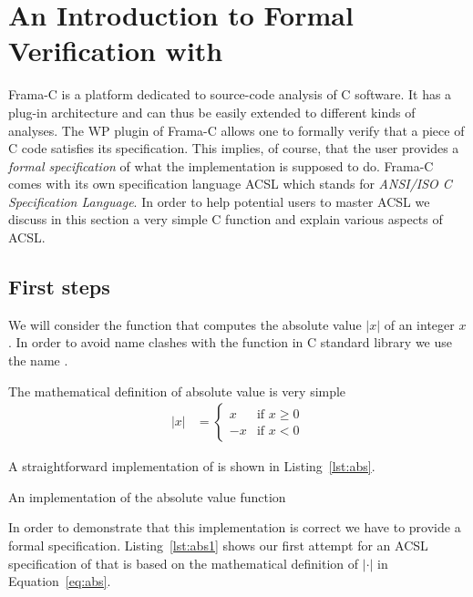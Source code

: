 
\section{An Introduction to Formal Verification with \framacwp}
\label{sec:frama-c}

Frama-C is a platform dedicated to source-code analysis of C software.
It has a plug-in architecture and can thus be easily extended to 
different kinds of analyses.
The WP plugin of Frama-C allows one to formally verify that a piece of
C code satisfies its specification.
This implies, of course, that the user provides a \emph{formal specification}
of what the implementation is supposed to do.
Frama-C comes with its own specification language ACSL which stands for
\emph{ANSI\slash ISO C Specification Language}.
In order to help potential users to master ACSL we discuss in this section 
a very simple C function and explain various aspects of ACSL.

\subsection{First steps}

We will consider the function that computes the absolute value $|x|$
of an integer $x$.
In order to avoid name clashes with the function  in C standard library
we use the name .

The mathematical definition of absolute value is very simple
\begin{align}
\label{eq:abs}
   |x| &= \left\{
            \begin{array}{rl}
               x  & \text{if $x \geq 0$} \\
               -x & \text{if $x < 0$}
            \end{array}
          \right.
\end{align}

A straightforward implementation of  is shown in Listing~\ref{lst:abs}.

\begin{listing}[hbt]
\begin{minipage}{\textwidth}

\end{minipage}
\caption{\label{lst:abs} An implementation of the absolute value function}
\end{listing}

In order to demonstrate that this implementation is correct we have to provide
a formal specification.
Listing~\ref{lst:abs1} shows our first attempt for an ACSL specification of  that
is based on the mathematical definition of $|\cdot|$ in Equation~\ref{eq:abs}.

